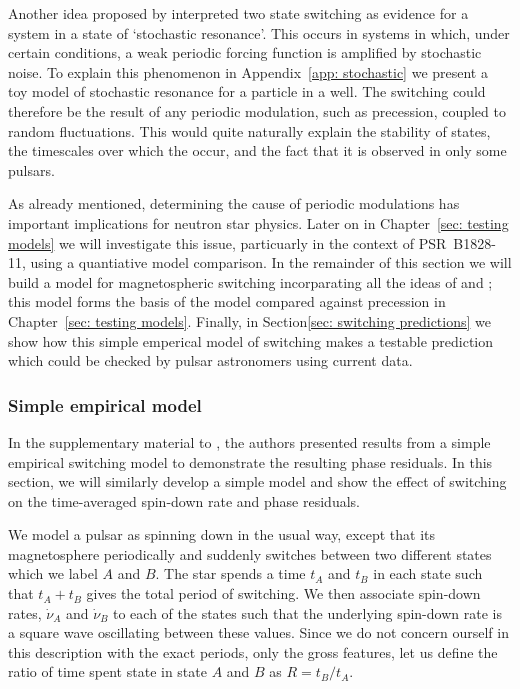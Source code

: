 Another idea proposed by \citet{Cordes2013} interpreted two state
switching as evidence for a system in a state of `stochastic resonance'.  This
occurs in systems in which, under certain conditions, a weak periodic forcing
function is amplified by stochastic noise. To explain this phenomenon in
Appendix~\ref{app: stochastic} we present a toy model of stochastic resonance
for a particle in a well. The switching could therefore be the result of any
periodic modulation, such as precession, coupled to random fluctuations. This
would quite naturally explain the stability of states, the timescales over
which the occur, and the fact that it is observed in only some pulsars.

As already mentioned, determining the cause of periodic modulations has
important implications for neutron star physics. Later on in Chapter~\ref{sec:
testing models} we will investigate this issue, particuarly in the context of
PSR~B1828-11, using a quantiative model comparison. In the remainder of this
section we will build a model for magnetospheric switching incorparating all
the ideas of \citet{Lyne2010} and \citet{Perera2014}; this model forms the basis
of the model compared against precession in Chapter~\ref{sec: testing models}.
Finally, in Section\ref{sec: switching predictions} we show how this simple
emperical model of switching makes a testable prediction which could be
checked by pulsar astronomers using current data.

\subsubsection{Simple empirical model}

In the supplementary material to \citet{Lyne2010}, the authors presented
results from a simple empirical switching model to demonstrate the resulting
phase residuals. In this section, we will similarly develop a simple model and
show the effect of switching on the time-averaged spin-down rate and phase
residuals.

We model a pulsar as spinning down in the usual way, except that its
magnetosphere periodically and suddenly switches between two different states which
we label $A$ and $B$. The star spends a time $t_A$ and $t_B$ in each state such
that $t_A+t_B$ gives the total period of switching. We then associate spin-down
rates, $\dot{\nu}_{A}$ and $\dot{\nu}_{B}$ to each of the states such that the
underlying spin-down rate is a square wave oscillating between these values.
Since we do not concern ourself in this description with the exact periods,
only the gross features, let us define the ratio of time spent state in state
$A$ and $B$ as $R = t_{B}/t_{A}$.

